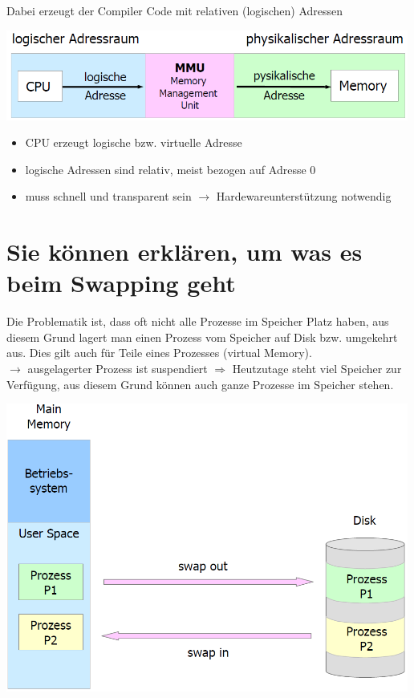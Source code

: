 \documentclass{report}
\newenvironment{Figure}
	{\par\medskip\noindent\minipage{\linewidth}}
	{\endminipage\par\medskip}
\theoremstyle{definition}
\theoremstyle{example}
\begin{document}
Dabei erzeugt der Compiler Code mit relativen (logischen) Adressen
\begin{Figure}
\centering
\includegraphics[width=500px]{img/logPhyMemMgmt.png}
	\label{fig:Abbildung logische vs. physikalische Adressen}
\end{Figure}

\begin{itemize}
	\item CPU erzeugt logische bzw. virtuelle Adresse
	\item logische Adressen sind relativ, meist bezogen auf Adresse 0
	\item muss schnell und transparent sein $\rightarrow$ Hardewareunterstützung notwendig
\end{itemize}


\section{Sie können erklären, um was es beim Swapping geht}
Die Problematik ist, dass oft nicht alle Prozesse im Speicher Platz haben, aus diesem Grund lagert man einen Prozess vom Speicher auf Disk bzw. umgekehrt aus. Dies gilt auch für Teile eines Prozesses (virtual Memory).\\
$\rightarrow$ ausgelagerter Prozess ist suspendiert $\Rightarrow$ Heutzutage steht viel Speicher zur Verfügung, aus diesem Grund können auch ganze Prozesse im Speicher stehen.

\begin{Figure}
\centering
\includegraphics[width=500px]{img/Swapping.png}
	\label{fig:Abbildung Swapping}
\end{Figure}
\end{document}

